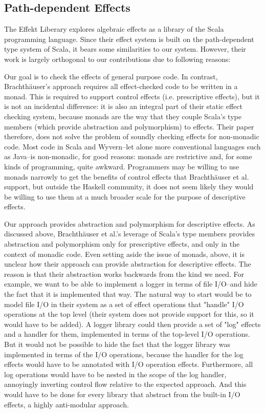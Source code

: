 \subsection{Path-dependent Effects}
The Effekt Liberary \citet{brachthauser20} explores algebraic effects as a library of the Scala programming language. Since their effect system is built on the path-dependent type system of Scala, it bears some similarities to our system. However, their work is largely orthogonal to our contributions due to following reasons: 

	 Our goal is to check the effects of general purpose code. In contrast, Brachthäuser's approach requires all effect-checked code to be written in a monad. This is required to support control effects (i.e. prescriptive effects), but it is not an incidental difference: it is also an integral part of their static effect checking system, because monads are the way that they couple Scala's type members (which provide abstraction and polymorphism) to effects. Their paper therefore, does not solve the problem of soundly checking effects for non-monadic code. Most code in Scala and Wyvern--let alone more conventional languages such as Java--is non-monadic, for good reasons: monads are restrictive and, for some kinds of programming, quite awkward. Programmers may be willing to use monads narrowly to get the benefits of control effects that Brachthäuser et al. support, but outside the Haskell community, it does not seem likely they would be willing to use them at a much broader scale for the purpose of descriptive effects.
	 
   Our approach provides abstraction and polymorphism for descriptive effects. As discussed above, Brachthäuser et al.'s leverage of Scala's type members provides abstraction and polymorphism only for prescriptive effects, and only in the context of monadic code. Even setting aside the issue of monads, above, it is unclear how their approach can provide abstraction for descriptive effects. The reason is that their abstraction works backwards from the kind we need. For example, we want to be able to implement a logger in terms of file I/O--and hide the fact that it is implemented that way. The natural way to start would be to model file I/O in their system as a set of effect operations that "handle" I/O operations at the top level (their system does not provide support for this, so it would have to be added). A logger library could then provide a set of "log" effects and a handler for them, implemented in terms of the top-level I/O operations. But it would not be possible to hide the fact that the logger library was implemented in terms of the I/O operations, because the handler for the log effects would have to be annotated with I/O operation effects. Furthermore, all log operations would have to be nested in the scope of the log handler, annoyingly inverting control flow relative to the expected approach. And this would have to be done for every library that abstract from the built-in I/O effects, a highly anti-modular approach.
	



